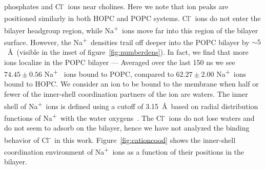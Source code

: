 \documentclass[12pt,openany,final]{book}
\newcommand{\na}{Na\textsuperscript{+}~}
\newcommand{\cl}{Cl\textsuperscript{-}~}
\begin{document}
phosphates and \cl ions near cholines. Here we note that ion peaks are positioned similarly in both HOPC and 
POPC systems. \cl ions do not enter the bilayer headgroup region, while \na ions move far into this region
of the bilayer surface. However, the \na densities trail off deeper into the POPC bilayer by 
$\sim5$~\AA~(visible in the inset of figure~\ref{fig:numberdens}). 
In fact, we find that more ions localize in the POPC bilayer --- Averaged over the last 150 ns we see
$74.45 \pm 0.56$ \na  
ions bound to POPC, 
compared to 
$62.27\pm 2.00$ \na ions bound to HOPC.
We consider an ion to be bound to the membrane when half or fewer of the inner-shell coordination partners of the 
ion are waters. The inner shell of \na ions is defined using a cutoff of 3.15~\AA~based on radial distribution functions of \na with the water oxygens~\cite{varma:2008:JACS}.
The \cl ions do not lose waters and do not seem to adsorb on the bilayer, hence we have not analyzed
the binding behavior of \cl in this work.
Figure~\ref{fig:cationcood} shows the inner-shell coordination environment of \na ions as a 
function of their positions in the bilayer. 
\end{document}
